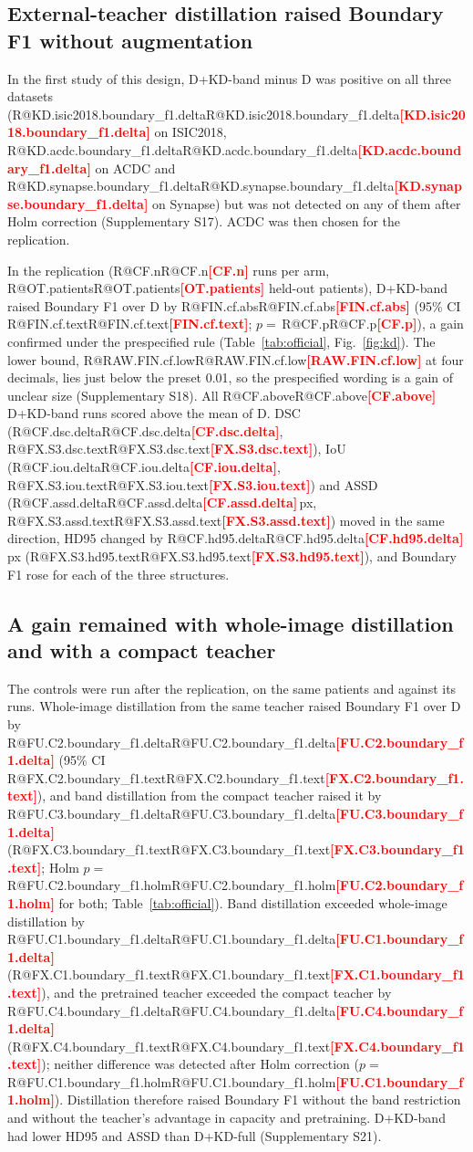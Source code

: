\documentclass[fleqn,10pt,lineno]{wlpeerj}
\makeatletter
\newcommand{\R}[1]{\ifcsname R@#1\endcsname\csname R@#1\endcsname\else\textbf{\textcolor{red}{[#1]}}\fi}
\makeatother
\begin{document}
\begin{table}[!tb]
\centering

\caption{\label{tab:innetwork}Boundary F1 contrasts for the boundary components; $\Delta$ is the first arm minus the second. A: pooled, inverse-variance fixed-effect summary of the three datasets. B: fresh-seed estimates use seeds 4--10, with Holm correction over the six contrasts. Forest plot and other metrics: Supplementary S13.}
\end{table}

\subsection*{External-teacher distillation raised Boundary F1 without augmentation}
In the first study of this design, D+KD-band minus D was positive on all three datasets (\R{KD.isic2018.boundary_f1.delta} on ISIC2018, \R{KD.acdc.boundary_f1.delta} on ACDC and \R{KD.synapse.boundary_f1.delta} on Synapse) but was not detected on any of them after Holm correction (Supplementary S17). ACDC was then chosen for the replication.

In the replication (\R{CF.n} runs per arm, \R{OT.patients} held-out patients), D+KD-band raised Boundary F1 over D by \R{FIN.cf.abs} (95\% CI \R{FIN.cf.text}; $p=$\,\R{CF.p}), a gain confirmed under the prespecified rule (Table~\ref{tab:official}, Fig.~\ref{fig:kd}). The lower bound, \R{RAW.FIN.cf.low} at four decimals, lies just below the preset 0.01, so the prespecified wording is a gain of unclear size (Supplementary S18). All \R{CF.above} D+KD-band runs scored above the mean of D. DSC (\R{CF.dsc.delta}, \R{FX.S3.dsc.text}), IoU (\R{CF.iou.delta}, \R{FX.S3.iou.text}) and ASSD (\R{CF.assd.delta}\,px, \R{FX.S3.assd.text}) moved in the same direction, HD95 changed by \R{CF.hd95.delta}\,px (\R{FX.S3.hd95.text}), and Boundary F1 rose for each of the three structures.

\subsection*{A gain remained with whole-image distillation and with a compact teacher}
The controls were run after the replication, on the same patients and against its runs. Whole-image distillation from the same teacher raised Boundary F1 over D by \R{FU.C2.boundary_f1.delta} (95\% CI \R{FX.C2.boundary_f1.text}), and band distillation from the compact teacher raised it by \R{FU.C3.boundary_f1.delta} (\R{FX.C3.boundary_f1.text}; Holm $p=$\,\R{FU.C2.boundary_f1.holm} for both; Table~\ref{tab:official}). Band distillation exceeded whole-image distillation by \R{FU.C1.boundary_f1.delta} (\R{FX.C1.boundary_f1.text}), and the pretrained teacher exceeded the compact teacher by \R{FU.C4.boundary_f1.delta} (\R{FX.C4.boundary_f1.text}); neither difference was detected after Holm correction ($p=$\,\R{FU.C1.boundary_f1.holm}). Distillation therefore raised Boundary F1 without the band restriction and without the teacher's advantage in capacity and pretraining. D+KD-band had lower HD95 and ASSD than D+KD-full (Supplementary S21).
\end{document}
